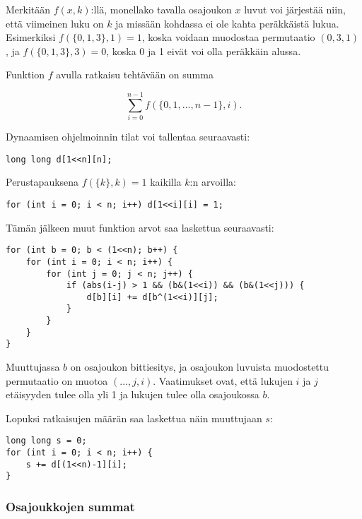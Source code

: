 Merkitään $f(x,k)$:llä,
monellako tavalla osajoukon
$x$ luvut voi järjestää niin,
että viimeinen luku on $k$ ja missään kohdassa
ei ole kahta peräkkäistä lukua.
Esimerkiksi $f(\{0,1,3\},1)=1$,
koska voidaan muodostaa permutaatio $(0,3,1)$,
ja $f(\{0,1,3\},3)=0$, koska 0 ja 1 eivät
voi olla peräkkäin alussa.

Funktion $f$ avulla ratkaisu tehtävään
on summa

\[ \sum_{i=0}^{n-1} f(\{0,1,\ldots,n-1\},i). \]

\noindent
Dynaamisen ohjelmoinnin tilat voi
tallentaa seuraavasti:

\begin{lstlisting}
long long d[1<<n][n];
\end{lstlisting}

\noindent
Perustapauksena $f(\{k\},k)=1$ kaikilla $k$:n arvoilla:

\begin{lstlisting}
for (int i = 0; i < n; i++) d[1<<i][i] = 1;
\end{lstlisting}

\noindent
Tämän jälkeen muut funktion arvot
saa laskettua seuraavasti:

\begin{lstlisting}
for (int b = 0; b < (1<<n); b++) {
    for (int i = 0; i < n; i++) {
        for (int j = 0; j < n; j++) {
            if (abs(i-j) > 1 && (b&(1<<i)) && (b&(1<<j))) {
                d[b][i] += d[b^(1<<i)][j];
            }
        }
    }
}
\end{lstlisting}

\noindent
Muuttujassa $b$ on osajoukon bittiesitys,
ja osajoukon luvuista muodostettu
permutaatio on muotoa $(\ldots,j,i)$.
Vaatimukset ovat, että lukujen $i$ ja $j$
etäisyyden tulee olla yli 1
ja lukujen tulee olla osajoukossa $b$.

Lopuksi ratkaisujen määrän saa laskettua näin
muuttujaan $s$:

\begin{lstlisting}
long long s = 0;
for (int i = 0; i < n; i++) {
    s += d[(1<<n)-1][i];
}
\end{lstlisting}

\subsubsection{Osajoukkojen summat}

